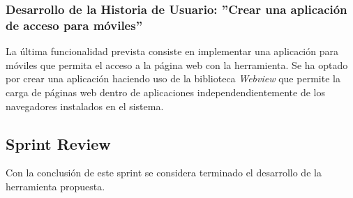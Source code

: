 	\subsubsection{Desarrollo de la Historia de Usuario: ''Crear una aplicación de acceso para móviles''}
La última funcionalidad prevista consiste en implementar una aplicación para móviles que permita el acceso a la página web con la herramienta. Se ha optado por crear una aplicación haciendo uso de la biblioteca \textit{Webview} que permite la carga de páginas web dentro de aplicaciones independendientemente de los navegadores instalados en el sistema.
	
			
	\subsection{Sprint Review}
Con la conclusión de este sprint se considera terminado el desarrollo de la herramienta propuesta.
	
